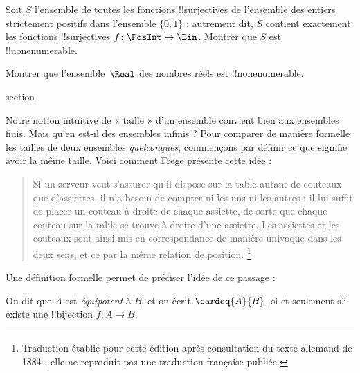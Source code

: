 \documentclass[11pt,a4paper,openany]{memoir}
\begin{document}
\begin{prob}
Soit $S$ l'ensemble de toutes les fonctions !!{surjective}s de
l'ensemble des entiers strictement positifs dans l'ensemble $\{0,1\}$ :
autrement dit, $S$ contient exactement les fonctions !!{surjective}s
$f\colon \PosInt \to \Bin$. Montrer que $S$ est !!{nonenumerable}.
\end{prob}

\begin{prob}
Montrer que l'ensemble~$\Real$ des nombres réels est !!{nonenumerable}.
\end{prob}


\endgroup



\begingroup
\expandafter\def\csname ol@sectioncs\endcsname{section}
\def\olfilename{equinumerous-sets}




Notre notion intuitive de « taille » d'un ensemble convient bien aux
ensembles finis. Mais qu'en est-il des ensembles infinis ? Pour
comparer de manière formelle les tailles de deux ensembles
\emph{quelconques}, commençons par définir ce que signifie avoir la
même taille. Voici comment Frege présente cette idée :
\begin{quote}
  Si un serveur veut s'assurer qu'il dispose sur la table autant de
  couteaux que d'assiettes, il n'a besoin de compter ni les uns ni les
  autres : il lui suffit de placer un couteau à droite de chaque
  assiette, de sorte que chaque couteau sur la table se trouve à droite
  d'une assiette. Les assiettes et les couteaux sont ainsi mis en
  correspondance de manière univoque dans les deux sens, et ce par la
  même relation de position. \citep[\S70]{Frege1884}\footnote{Traduction
  établie pour cette édition après consultation du texte allemand de
  1884 ; elle ne reproduit pas une traduction française publiée.}
\end{quote}
Une définition formelle permet de préciser l'idée de ce passage :

\begin{defn}
  On dit que $A$ est \emph{équipotent} à $B$, et on écrit
  $\cardeq{A}{B}$, si et seulement s'il existe une !!{bijection}
  $f \colon A \to B$.
\end{defn}
\end{document}
